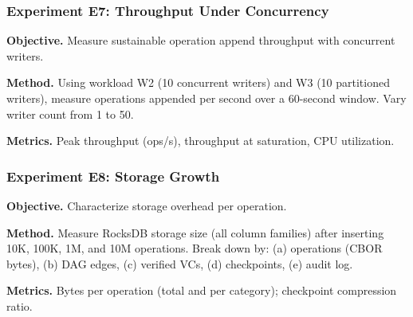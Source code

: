 \subsubsection{Experiment E7: Throughput Under Concurrency}
\textbf{Objective.} Measure sustainable operation append throughput with concurrent writers.

\textbf{Method.} Using workload W2 (10 concurrent writers) and W3 (10 partitioned writers), measure operations appended per second over a 60-second window. Vary writer count from 1 to 50.

\textbf{Metrics.} Peak throughput (ops/s), throughput at saturation, CPU utilization.



\subsubsection{Experiment E8: Storage Growth}
\textbf{Objective.} Characterize storage overhead per operation.

\textbf{Method.} Measure RocksDB storage size (all column families) after inserting 10K, 100K, 1M, and 10M operations. Break down by: (a) operations (CBOR bytes), (b) DAG edges, (c) verified VCs, (d) checkpoints, (e) audit log.

\textbf{Metrics.} Bytes per operation (total and per category); checkpoint compression ratio.


